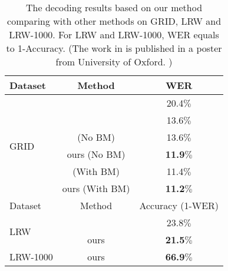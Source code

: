 \documentclass[a4paper, 10pt, conference]{ieeeconf}      %
\begin{document}
\begin{table}[H]
	\caption{The decoding results based on our method comparing with other methods on GRID, LRW and LRW-1000. For LRW and  LRW-1000, WER equals to 1-Accuracy.  (The work in \cite{Afouras2017} is published in a poster from University of Oxford. ) 
		\vspace{-0.0cm}} \label{table5}
	\setlength{\abovecaptionskip}{0.1cm}   %
	\setlength{\belowcaptionskip}{0cm} 
	\centering
	\begin{tabular}{|p{1.39cm}|c|c|}    
		\hline
		Dataset & Method& WER \\
		\hline
		\hline
		\multirow{6}{*}{GRID}&\cite{Wand2016} & 20.4$\%$      \\
		~&\cite{Gergen2016} & 13.6$\%$     \\
		~&\cite{Assael2016} (No BM) & 13.6$\%$         \\
		~&ours (No BM) & \textbf{11.9}$\%$        \\
		~&\cite{Assael2016} (With BM) & {11.4}$\%$       \\
		~&ours (With BM) & \textbf{11.2}$\%$     \\
		\hline
		\hline
		Dataset & Method& Accuracy (1-WER) \\
		\hline
		\multirow{2}{*}{LRW}&\cite{Afouras2017} &23.8$\%$  \\
		~&ours & \textbf{21.5}$\%$  \\	
		\hline
		\multirow{1}{*}{LRW-1000}&ours &\textbf{66.9}$\%$  \\
		\hline
		
	\end{tabular}
\end{table}
\end{document}
